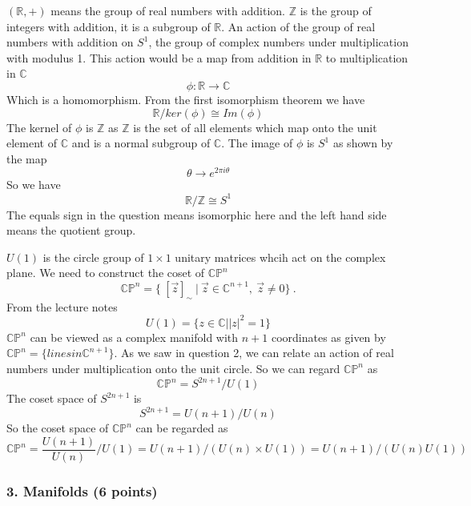 \documentclass[12pt]{article}
\newcounter{alplisti}
\renewcommand{\thealplisti}{\alph{alplisti}}
\newenvironment{alplist}[1][(\thealplisti)]{\begin{list}{{\rm #1}\ }{ %
      \usecounter{alplisti} %
    \setlength{\itemsep}{0pt}
    \setlength{\parsep}{0pt}  %
     \setlength{\topsep}{0pt} %
}}{\end{list}}
\newcommand{\C} {{\mathbb{C}}}
\begin{document}
\begin{alplist}
\item $(\mathbb{R}, +)$ means the group of real numbers with addition. $\mathbb{Z}$ is the group of integers with addition, it is a subgroup of $\mathbb{R}$. 
An action of the group of real numbers with addition on $S^1$, the group of complex numbers under multiplication with modulus 1. This action would be a map from addition in $\mathbb{R}$ to multiplication in $\mathbb{C}$ 
$$ \phi : \mathbb{R} \rightarrow \mathbb{C}$$ 
Which is a homomorphism. From the first isomorphism theorem we have 
$$ \mathbb{R}/ker(\phi) \cong Im(\phi) $$
The kernel of $\phi$ is $\mathbb{Z}$ as $\mathbb{Z}$ is the set of all elements which map onto the unit element of $\mathbb{C}$ and is a normal subgroup of $\mathbb{C}$. The image of $\phi$ is $S^1$ as shown by the map 
$$ \theta \rightarrow e^{2 \pi i \theta} $$ 
So we have 
$$ \mathbb{R} / \mathbb{Z} \cong S^1 $$ 
The equals sign in the question means isomorphic here and the left hand side means the quotient group. 
\\
\item $U(1)$ is the circle group of $1 \times 1$ unitary matrices whcih act on the complex plane. We need to construct the coset of $\mathbb{CP}^{n}$
$$
   \mathbb{CP}^{n} = \{ \ [\vec{ z}]_{\sim}\  |\  \vec{z} \in \C^{n+1},\ \vec{z}
   \neq 0 \} \ .
$$
From the lecture notes 
$$ U(1) = \{ z \in \mathbb{C} | |z|^2 =1 \}$$
$\mathbb{CP}^{n}$ can be viewed as a complex manifold with $n+1$ coordinates as given by $\mathbb{CP}^{n} = \{ lines in \mathbb{C}^{n+1}\}$. As we saw in question 2, we can relate an action of real numbers under multiplication onto the unit circle. So we can regard $\mathbb{CP}^{n}$ as 
$$ \mathbb{CP}^{n} = S^{2n+1} / U(1) $$
The coset space of $S^{2n+1}$ is 
$$ S^{2n+1} = U(n+1) / U(n) $$
So the coset space of $\mathbb{CP}^{n}$ can be regarded as 
$$ \mathbb{CP}^{n} = \frac{U(n+1)}{U(n)} / U(1) = U(n+1) / (U(n) \times U(1)) = U(n+1)/ (U(n)U(1)) $$
\end{alplist}

\newpage

\subsubsection*{3. Manifolds (6 points)}
\end{document}
